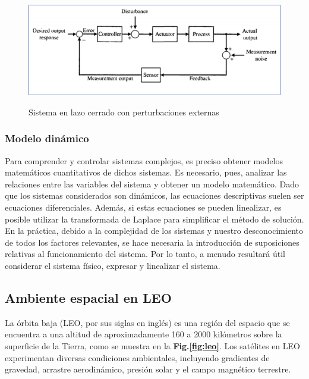 \begin{figure}[!ht]
	\begin{center}
		\includegraphics[scale=0.8]{imagenes/marco_teorico/lazo cerrado.PNG}\\
	\end{center}
	\caption{  Sistema en lazo cerrado con perturbaciones externas }
	\label{fig:feedback}
\end{figure}
\subsubsection{Modelo dinámico}

Para comprender y controlar sistemas complejos, es preciso obtener modelos matemáticos cuantitativos de dichos sistemas. Es necesario, pues, analizar las relaciones entre las variables del sistema y obtener un modelo matemático. Dado que los sistemas considerados son dinámicos, las ecuaciones descriptivas suelen ser ecuaciones diferenciales. Además, si estas ecuaciones se pueden linealizar, es posible utilizar la transformada de Laplace para simplificar el método de solución. En la práctica, debido a la complejidad de los sistemas y nuestro desconocimiento de todos los factores relevantes, se hace necesaria la introducción de suposiciones relativas al funcionamiento del sistema. Por lo tanto, a menudo resultará útil considerar el sistema físico, expresar y linealizar el sistema.
 
\subsection{Ambiente espacial en LEO}

La órbita baja (LEO, por sus siglas en inglés) es una región del espacio que se encuentra a una altitud de aproximadamente 160 a 2000 kilómetros sobre la superficie de la Tierra, como se muestra en la \textbf{Fig.\ref{fig:leo}}. Los satélites en LEO experimentan diversas condiciones ambientales, incluyendo gradientes de gravedad, arrastre aerodinámico, presión solar y el campo magnético terrestre. 


